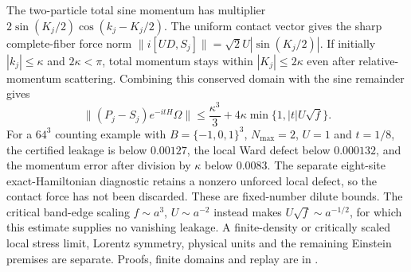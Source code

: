 The two-particle total sine momentum has multiplier
$2\sin(K_j/2)\cos(k_j-K_j/2)$.  The uniform contact vector gives the
sharp complete-fiber force norm
$\|i[UD,S_j]\|=\sqrt2U|\sin(K_j/2)|$.
If initially $|k_j|\leq\kappa$ and $2\kappa<\pi$, total momentum stays
within $|K_j|\leq2\kappa$ even after relative-momentum scattering.
Combining this conserved domain with the sine remainder gives
\[
 \|(P_j-S_j)e^{-itH}\Omega\|
 \leq\frac{\kappa^3}{3}
       +4\kappa\min\{1,|t|U\sqrt f\}.
\]
For a $64^3$ counting example with $B=\{-1,0,1\}^3$, $N_{\max}=2$,
$U=1$ and $t=1/8$, the certified leakage is below $0.00127$, the local
Ward defect below $0.000132$, and the momentum error after division by
$\kappa$ below $0.0083$.  The separate eight-site exact-Hamiltonian
diagnostic retains a nonzero unforced local defect, so the contact force
has not been discarded.  These are fixed-number dilute bounds.  The
critical band-edge scaling $f\sim a^3$, $U\sim a^{-2}$ instead makes
$U\sqrt f\sim a^{-1/2}$, for which this estimate supplies no vanishing
leakage.  A finite-density or critically scaled local stress limit,
Lorentz symmetry, physical units and the remaining Einstein premises
are separate.  Proofs, finite domains and replay are in
.
